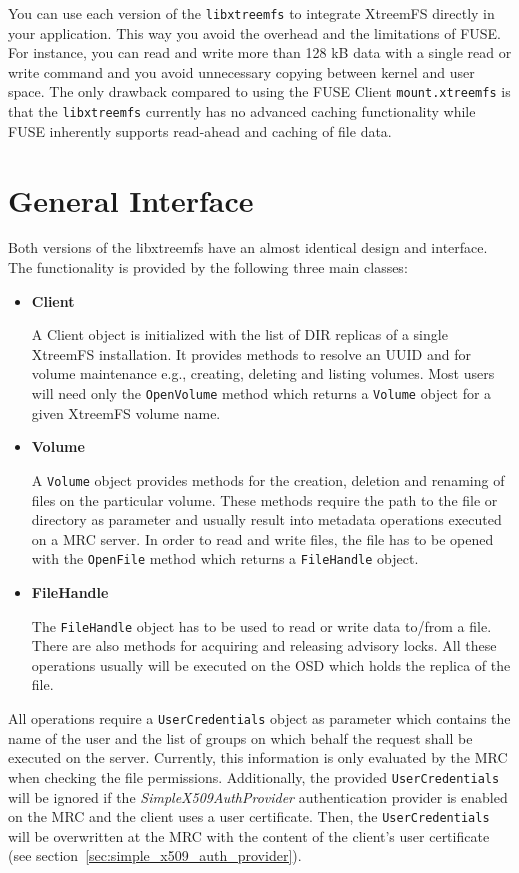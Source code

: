 \documentclass[a4paper,10pt]{book}
\begin{document}
You can use each version of the \texttt{libxtreemfs} to integrate XtreemFS directly in your application. This way you avoid the overhead and the limitations of FUSE. For instance, you can read and write more than 128 kB data with a single read or write command and you avoid unnecessary copying between kernel and user space. The only drawback compared to using the FUSE Client \texttt{mount.xtreemfs} is that the \texttt{libxtreemfs} currently has no advanced caching functionality while FUSE inherently supports read-ahead and caching of file data.

\section{General Interface}

Both versions of the libxtreemfs have an almost identical design and interface. The functionality is provided by the following three main classes:

\begin{itemize}
 \item \textbf{Client}

A Client object is initialized with the list of DIR replicas of a single XtreemFS installation.
It provides methods to resolve an UUID and for volume maintenance e.g., creating, deleting and listing volumes.
Most users will need only the \texttt{OpenVolume} method which returns a \texttt{Volume} object for a given XtreemFS volume name.

 \item \textbf{Volume}

A \texttt{Volume} object provides methods for the creation, deletion and renaming of files on the particular volume. These methods require the path to the file or directory as parameter and usually result into metadata operations executed on a MRC server. In order to read and write files, the file has to be opened with the \texttt{OpenFile} method which returns a \texttt{FileHandle} object.

 \item \textbf{FileHandle}

The \texttt{FileHandle} object has to be used to read or write data to/from a file. There are also methods for acquiring and releasing advisory locks. All these operations usually will be executed on the OSD which holds the replica of the file.

\end{itemize}

All operations require a \texttt{UserCredentials} object as parameter which contains the name of the user and the list of groups on which behalf the request shall be executed on the server. Currently, this information is only evaluated by the MRC when checking the file permissions. Additionally, the provided \texttt{UserCredentials} will be ignored if the \emph{SimpleX509AuthProvider} authentication provider is enabled on the MRC and the client uses a user certificate. Then, the \texttt{UserCredentials} will be overwritten at the MRC with the content of the client's user certificate (see section~\ref{sec:simple_x509_auth_provider}).
\end{document}
